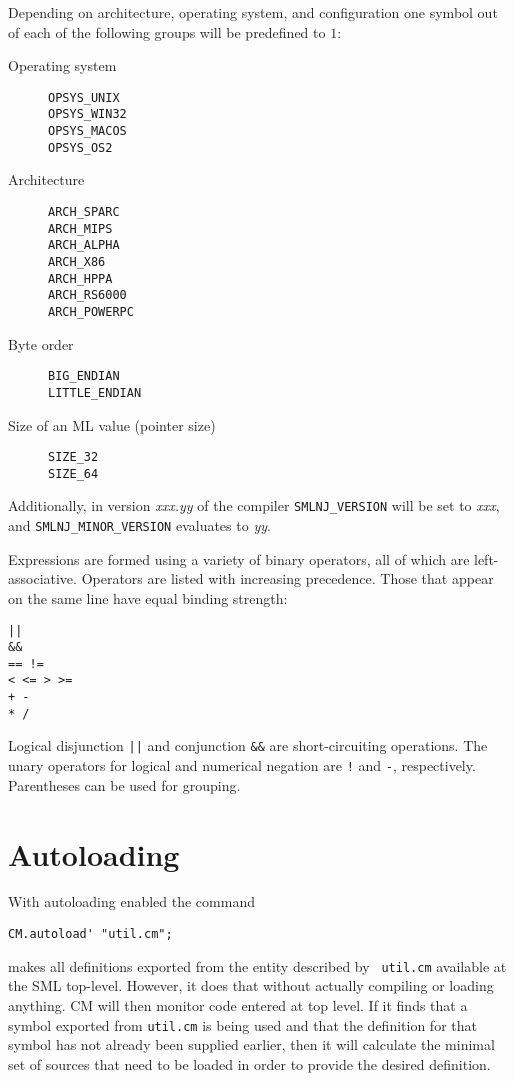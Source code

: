 \documentclass{article}
\begin{document}
Depending on architecture, operating system, and configuration one
symbol out of each of the following groups will be predefined to $1$:

\begin{description}
\item[Operating system]
\noindent\begin{verbatim}
OPSYS_UNIX
OPSYS_WIN32
OPSYS_MACOS
OPSYS_OS2
\end{verbatim}
\item[Architecture]
\noindent\begin{verbatim}
ARCH_SPARC
ARCH_MIPS
ARCH_ALPHA
ARCH_X86
ARCH_HPPA
ARCH_RS6000
ARCH_POWERPC
\end{verbatim}
\item[Byte order]
\noindent\begin{verbatim}
BIG_ENDIAN
LITTLE_ENDIAN
\end{verbatim}
\item[Size of an ML value (pointer size)]
\noindent\begin{verbatim}
SIZE_32
SIZE_64
\end{verbatim}
\end{description}

Additionally, in version {\it xxx.yy} of the compiler
\verb+SMLNJ_VERSION+ will be set to {\it xxx}, and
\verb+SMLNJ_MINOR_VERSION+ evaluates to {\it yy}.

Expressions are formed using a variety of binary operators, all of
which are left-associative.  Operators are listed with increasing
precedence. Those that appear on the same line have equal binding
strength:
\begin{verbatim}
||
&&
== !=
< <= > >=
+ -
* /
\end{verbatim}
Logical disjunction \verb+||+ and conjunction \verb+&&+ are
short-circuiting operations.  The unary operators for logical and
numerical negation are \verb+!+ and \verb+-+,
respectively. Parentheses can be used for grouping.

\section{Autoloading}

With autoloading enabled the command
\begin{verbatim}
CM.autoload' "util.cm";
\end{verbatim}
makes all definitions exported from the entity described by {\tt
util.cm} available at the SML top-level.  However, it does that
without actually compiling or loading anything.  CM will then monitor
code entered at top level. If it finds that a symbol exported from
{\tt util.cm} is being used and that the definition for that symbol
has not already been supplied earlier, then it will calculate the
minimal set of sources that need to be loaded in order to provide the
desired definition.
\end{document}
